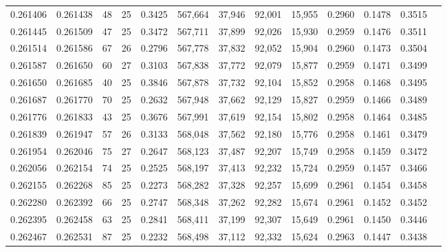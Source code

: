 \begin{tabular}{rrrrrrrrrrrrr}
0.261406 & 0.261438 &  48 &  25 &                                     0.3425 & 567,664 &  37,946 &  92,001 &  15,955 & 0.2960 & 0.1478 & 0.3515 \\
0.261445 & 0.261509 &  47 &  25 &                                     0.3472 & 567,711 &  37,899 &  92,026 &  15,930 & 0.2959 & 0.1476 & 0.3511 \\
0.261514 & 0.261586 &  67 &  26 &                                     0.2796 & 567,778 &  37,832 &  92,052 &  15,904 & 0.2960 & 0.1473 & 0.3504 \\
0.261587 & 0.261650 &  60 &  27 &                                     0.3103 & 567,838 &  37,772 &  92,079 &  15,877 & 0.2959 & 0.1471 & 0.3499 \\
0.261650 & 0.261685 &  40 &  25 &                                     0.3846 & 567,878 &  37,732 &  92,104 &  15,852 & 0.2958 & 0.1468 & 0.3495 \\
0.261687 & 0.261770 &  70 &  25 &                                     0.2632 & 567,948 &  37,662 &  92,129 &  15,827 & 0.2959 & 0.1466 & 0.3489 \\
0.261776 & 0.261833 &  43 &  25 &                                     0.3676 & 567,991 &  37,619 &  92,154 &  15,802 & 0.2958 & 0.1464 & 0.3485 \\
0.261839 & 0.261947 &  57 &  26 &                                     0.3133 & 568,048 &  37,562 &  92,180 &  15,776 & 0.2958 & 0.1461 & 0.3479 \\
0.261954 & 0.262046 &  75 &  27 &                                     0.2647 & 568,123 &  37,487 &  92,207 &  15,749 & 0.2958 & 0.1459 & 0.3472 \\
0.262056 & 0.262154 &  74 &  25 &                                     0.2525 & 568,197 &  37,413 &  92,232 &  15,724 & 0.2959 & 0.1457 & 0.3466 \\
0.262155 & 0.262268 &  85 &  25 &                                     0.2273 & 568,282 &  37,328 &  92,257 &  15,699 & 0.2961 & 0.1454 & 0.3458 \\
0.262280 & 0.262392 &  66 &  25 &                                     0.2747 & 568,348 &  37,262 &  92,282 &  15,674 & 0.2961 & 0.1452 & 0.3452 \\
0.262395 & 0.262458 &  63 &  25 &                                     0.2841 & 568,411 &  37,199 &  92,307 &  15,649 & 0.2961 & 0.1450 & 0.3446 \\
0.262467 & 0.262531 &  87 &  25 &                                     0.2232 & 568,498 &  37,112 &  92,332 &  15,624 & 0.2963 & 0.1447 & 0.3438 \\

\end{tabular}
